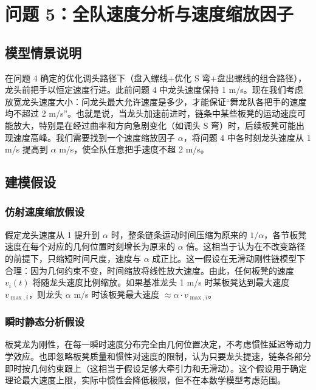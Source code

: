 \documentclass[UTF8]{ctexart}
\begin{document}
\newpage

\section{问题 5：全队速度分析与速度缩放因子}

\subsection{模型情景说明}
在问题 4 确定的优化调头路径下（盘入螺线+优化 S 弯+盘出螺线的组合路径），龙头前把手以恒定速度行进。此前问题 4 中龙头速度保持 1 m/s。现在我们考虑放宽龙头速度大小：问龙头最大允许速度是多少，才能保证“舞龙队各把手的速度均不超过 2 m/s”。也就是说，当龙头加速前进时，链条中某些板凳的运动速度可能放大，特别是在经过曲率和方向急剧变化（如调头 S 弯）时，后续板凳可能出现速度高峰。我们需要找到一个速度缩放因子 $\alpha$，将问题 4 中各时刻龙头速度从 1 m/s 提高到 $\alpha$ m/s，使全队任意把手速度不超 2 m/s。

\subsection{建模假设}

\subsubsection{仿射速度缩放假设}
假定龙头速度从 1 提升到 $\alpha$ 时，整条链条运动时间压缩为原来的 $1/\alpha$，各节板凳速度在每个对应的几何位置时刻增长为原来的 $\alpha$ 倍。这相当于认为在不改变路径的前提下，只缩短时间尺度，速度与 $\alpha$ 成正比。这一假设在无滑动刚性链模型下合理：因为几何约束不变，时间缩放将线性放大速度。由此，任何板凳的速度 $v_i(t)$ 将随龙头速度比例缩放。如果基准龙头 1 m/s 时某板凳达到最大速度 $v_{\max,i}$，则龙头 $\alpha$ m/s 时该板凳最大速度 $\approx \alpha \cdot v_{\max,i}$。

\subsubsection{瞬时静态分析假设}
板凳龙为刚性，在每一瞬时速度分布完全由几何位置决定，不考虑惯性延迟等动力学效应。也即忽略板凳质量和惯性对速度的限制，认为只要龙头提速，链条各部分即时按几何约束跟上（这相当于假设足够大牵引力和无滑动）。这个假设用于确定理论最大速度上限，实际中惯性会降低极限，但不在本数学模型考虑范围。
\end{document}

